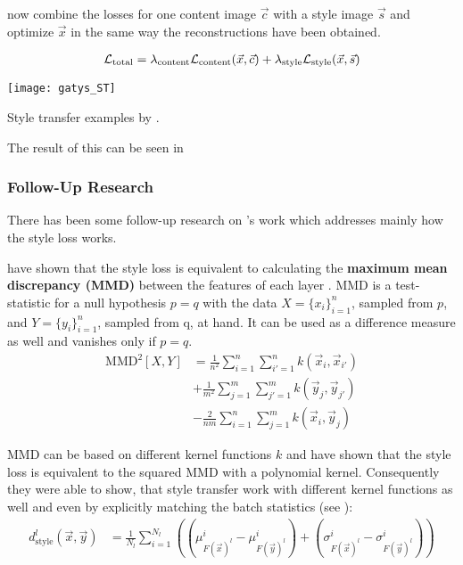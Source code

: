 \citeauthor*{gatys} now combine the losses for one content image $\vec{c}$ with a style image $\vec{s}$ and optimize $\vec{x}$ in the same way the reconstructions have been obtained.

\begin{align}
    \mathcal{L}_{\text{total}} = \lambda_{\text{content}} \mathcal{L}_{\text{content}}(\vec{x}, \vec{c}) + \lambda_{\text{style}} \mathcal{L}_{\text{style}}(\vec{x}, \vec{s})
\end{align}

\begin{marginfigure}
    \texttt{[image: gatys\_ST]}
    \caption[]{Style transfer examples by \citeauthor*{gatys}. \cite{gatys}}
\end{marginfigure}

The result of this can be seen in 

\subsubsection{Follow-Up Research}
There has been some follow-up research on \citeauthor*{gatys}'s work which addresses mainly how the style loss works.

\citeauthor*{MMD} have shown that the style loss is equivalent to calculating the \textbf{maximum mean discrepancy (MMD)} between the features of each layer \cite{MMD}.
MMD is a test-statistic for a null hypothesis $p=q$ with the data $X = \{x_i\}^n_{i=1}$, sampled from $p$, and $Y = \{y_i\}^n_{i=1}$, sampled from q, at hand.
It can be used as a difference measure as well and vanishes only if $p=q$.
\begin{align}
    \text{MMD}^2[X, Y] & = \frac{1}{n^2} \sum^n_{i=1} \sum^n_{i'=1} k(\vec{x}_i, \vec{x}_{i'}) \\
    & + \frac{1}{m^2} \sum^m_{j=1} \sum^m_{j'=1} k(\vec{y}_j, \vec{y}_{j'}) \\
    & - \frac{2}{nm} \sum^n_{i=1} \sum^m_{j=1} k(\vec{x}_i, \vec{y}_{j})
\end{align}

MMD can be based on different kernel functions $k$ and \citeauthor*{MMD} have shown that the style loss is equivalent to the squared MMD with a polynomial kernel.
Consequently they were able to show, that style transfer work with different kernel functions as well and even by explicitly matching the batch statistics (see ):
\begin{align}
    d_{\text{style}}^l(\vec{x}, \vec{y}) & = \frac{1}{N_l} \sum_{i = 1}^{N_l} \left( (\mu^i_{F(\vec{x})^l} - \mu^i_{F(\vec{y})^l}) + (\sigma^i_{F(\vec{x})^l} - \sigma^i_{F(\vec{y})^l}) \right)
\end{align}

